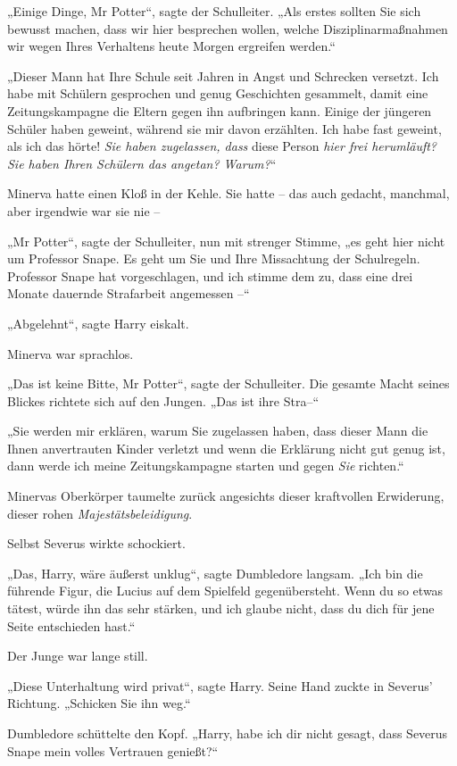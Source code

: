 {„Einige Dinge, Mr Potter“, sagte der Schulleiter. „Als erstes sollten Sie sich bewusst machen, dass wir hier besprechen wollen, welche Disziplinarmaßnahmen wir wegen Ihres Verhaltens heute Morgen ergreifen werden.“

„Dieser Mann hat Ihre Schule seit Jahren in Angst und Schrecken versetzt. Ich habe mit Schülern gesprochen und genug Geschichten gesammelt, damit eine Zeitungskampagne die Eltern gegen ihn aufbringen kann. Einige der jüngeren Schüler haben geweint, während sie mir davon erzählten. Ich habe fast geweint, als ich das hörte! \emph{Sie haben zugelassen, dass} diese Person \emph{hier frei herumläuft? Sie haben Ihren Schülern das angetan? Warum?}“

Minerva hatte einen Kloß in der Kehle. Sie hatte -- das auch gedacht, manchmal, aber irgendwie war sie nie --

„Mr Potter“, sagte der Schulleiter, nun mit strenger Stimme, „es geht hier nicht um Professor Snape. Es geht um Sie und Ihre Missachtung der Schulregeln. Professor Snape hat vorgeschlagen, und ich stimme dem zu, dass eine drei Monate dauernde Strafarbeit angemessen --“

„Abgelehnt“, sagte Harry eiskalt.

Minerva war sprachlos.

„Das ist keine Bitte, Mr Potter“, sagte der Schulleiter. Die gesamte Macht seines Blickes richtete sich auf den Jungen. „Das ist ihre Stra--“

„Sie werden mir erklären, warum Sie zugelassen haben, dass dieser Mann die Ihnen anvertrauten Kinder verletzt und wenn die Erklärung nicht gut genug ist, dann werde ich meine Zeitungskampagne starten und gegen \emph{Sie} richten.“

Minervas Oberkörper taumelte zurück angesichts dieser kraftvollen Erwiderung, dieser rohen \emph{Majestätsbeleidigung}.

Selbst Severus wirkte schockiert.

„Das, Harry, wäre äußerst unklug“, sagte Dumbledore langsam. „Ich bin die führende Figur, die Lucius auf dem Spielfeld gegenübersteht. Wenn du so etwas tätest, würde ihn das sehr stärken, und ich glaube nicht, dass du dich für jene Seite entschieden hast.“

Der Junge war lange still.

„Diese Unterhaltung wird privat“, sagte Harry. Seine Hand zuckte in Severus' Richtung. „Schicken Sie ihn weg.“

Dumbledore schüttelte den Kopf. „Harry, habe ich dir nicht gesagt, dass Severus Snape mein volles Vertrauen genießt?“

}
